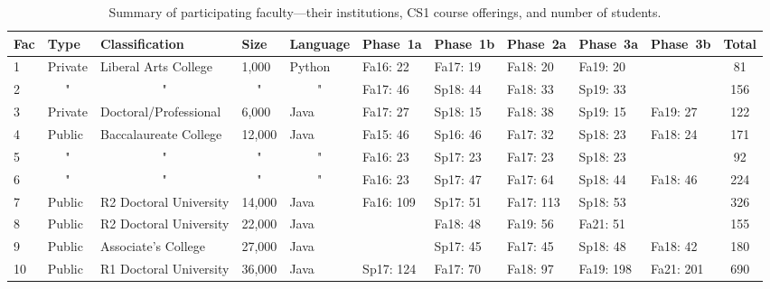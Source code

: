 \documentclass[sigconf]{acmart}
\begin{document}
\newcommand{\h}[1]{\textbf{#1}}
\newcommand{\ditto}{\multicolumn{1}{c}{"}}

\begin{table*}
\caption{Summary of participating faculty---their institutions, CS1 course offerings, and number of students.}
\label{tab:faculty}
\def\arraystretch{0.667}
\begin{tabular}{@{}llllllllllc@{}} \toprule
\h{Fac} & \h{Type} & \h{Classification}     & \h{Size} & \h{Language} & \h{Phase~1a} & \h{Phase~1b} & \h{Phase~2a} & \h{Phase~3a} & \h{Phase~3b} & \h{Total} \\ \midrule
1       & Private  & Liberal Arts College   & 1,000    & Python       & Fa16: 22     & Fa17: 19     & Fa18: 20     & Fa19: 20     &              & 81        \\ 
2       & \ditto   & \ditto                 & \ditto   & \ditto       & Fa17: 46     & Sp18: 44     & Fa18: 33     & Sp19: 33     &              & 156       \\
3       & Private  & Doctoral/Professional  & 6,000    & Java         & Fa17: 27     & Sp18: 15     & Fa18: 38     & Sp19: 15     & Fa19: 27     & 122       \\
4       & Public   & Baccalaureate College  & 12,000   & Java         & Fa15: 46     & Sp16: 46     & Fa17: 32     & Sp18: 23     & Fa18: 24     & 171       \\ 
5       & \ditto   & \ditto                 & \ditto   & \ditto       & Fa16: 23     & Sp17: 23     & Fa17: 23     & Sp18: 23     &              & 92        \\ 
6       & \ditto   & \ditto                 & \ditto   & \ditto       & Fa16: 23     & Sp17: 47     & Fa17: 64     & Sp18: 44     & Fa18: 46     & 224       \\
7       & Public   & R2 Doctoral University & 14,000   & Java         & Fa16: 109    & Sp17: 51     & Fa17: 113    & Sp18: 53     &              & 326       \\
8       & Public   & R2 Doctoral University & 22,000   & Java         &              & Fa18: 48     & Fa19: 56     & Fa21: 51     &              & 155       \\
9       & Public   & Associate's College    & 27,000   & Java         &              & Sp17: 45     & Fa17: 45     & Sp18: 48     & Fa18: 42     & 180       \\
10      & Public   & R1 Doctoral University & 36,000   & Java         & Sp17: 124    & Fa17: 70     & Fa18: 97     & Fa19: 198    & Fa21: 201    & 690       \\

\end{tabular}
\end{table*}
\end{document}
